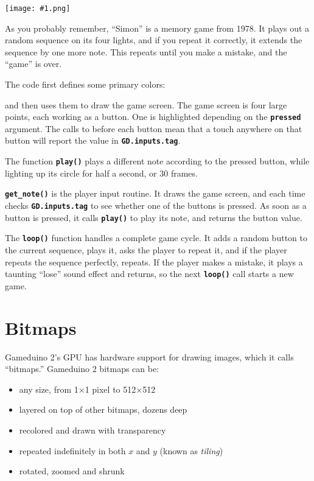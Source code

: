 \documentclass[10pt]{book}
\makeatletter
\newcommand{\png}[1]{
\begin{center}
\texttt{[image: \#1.png]}
\end{center}
}
\newcommand{\mach}[1]{\texttt{\textbf{#1}}}
\newcommand{\cmdidx}[1]{
\index{#1@\mach{#1()}}
}
\newcommand{\dcmd}[1]{\cmdidx{#1}\nameref{#1}}
\newcommand{\term}[1]{\emph{#1}\index{#1}}
\makeatother
\begin{document}
\png{simon}

As you probably remember, ``Simon'' is a memory game from 1978.
It plays out a random sequence on its four lights, and if you repeat it correctly, it extends the sequence by one more note.
This repeats until you make a mistake, and the ``game'' is over.

The code first defines some primary colors:


\noindent
and then uses them to draw the game screen.
The game screen is four large points, each working as a button.
One is highlighted depending on the \mach{pressed} argument.
The calls to \dcmd{Tag} before each button mean that a touch anywhere
on that button will report the value in \mach{GD.inputs.tag}.

\newpage
{}

The function \mach{play()} plays a different note according to the pressed button,
while lighting up its circle for half a second, or 30 frames.


\mach{get\_note()} is the player input routine.
It draws the game screen, and each time checks
\mach{GD.inputs.tag} to see whether one of the buttons is pressed.
As soon as a button is pressed, it calls \mach{play()} to play its note, and returns the button value.


The \mach{loop()} function
handles a complete game cycle.
It adds a random button to the current sequence, plays it, asks the player to repeat it,
and if the player repeats the sequence perfectly, repeats.
If the player makes a mistake, it plays a taunting ``lose'' sound effect and returns, so the next
\mach{loop()} call starts a new game.


\chapter{Bitmaps}

Gameduino 2's GPU has hardware support for drawing images,
which it calls ``bitmaps.''
Gameduino 2 bitmaps can be:

\begin{itemize}
\item any size, from 1$\times$1 pixel to 512$\times$512
\item layered on top of other bitmaps, dozens deep
\item recolored and drawn with transparency
\item repeated indefinitely in both $x$ and $y$ (known as \term{tiling})
\item rotated, zoomed and shrunk
\end{itemize}
\end{document}
